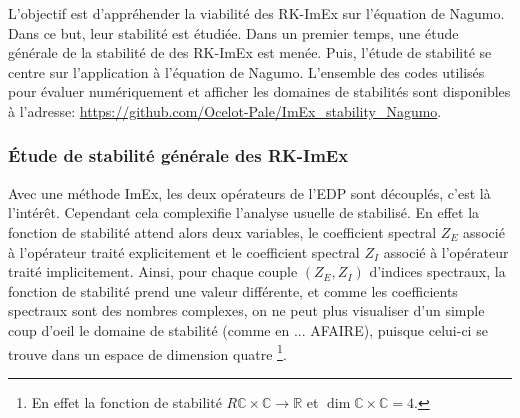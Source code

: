 L'objectif est d'appréhender la viabilité des RK-ImEx sur l'équation de Nagumo. Dans ce but, leur stabilité est étudiée.
Dans un premier temps, une étude générale de la stabilité de des RK-ImEx est menée.
Puis, l'étude de stabilité se centre sur l'application à l'équation de Nagumo. L'ensemble des codes utilisés pour évaluer numériquement et afficher les domaines de stabilités
sont disponibles à l'adresse: \href{https://github.com/Ocelot-Pale/ImEx_stability_Nagumo}{https://github.com/Ocelot-Pale/ImEx\_stability\_Nagumo}.



\subsubsection{Étude de stabilité générale des RK-ImEx}
    Avec une méthode ImEx, les deux opérateurs de l'EDP sont découplés, c'est là l'intérêt.
    Cependant cela complexifie l'analyse usuelle de stabilisé. 
    En effet la fonction de stabilité attend alors deux variables, %
    le coefficient spectral $Z_E$ associé à l'opérateur traité explicitement et
     le coefficient spectral $Z_I$ associé à l'opérateur traité implicitement.
    Ainsi, pour chaque couple $(Z_E,Z_I)$ d'indices spectraux, la fonction de stabilité prend une valeur différente, et comme les coefficients spectraux sont des nombres complexes, 
    on ne peut plus visualiser d'un simple coup d'oeil le domaine de stabilité (comme en ... AFAIRE), puisque celui-ci se trouve dans un espace de dimension quatre
    \footnote{En effet la fonction de stabilité $R \mathbb C \times \mathbb C \rightarrow \mathbb R$ et $\dim  \mathbb C \times \mathbb C=4$.}.
